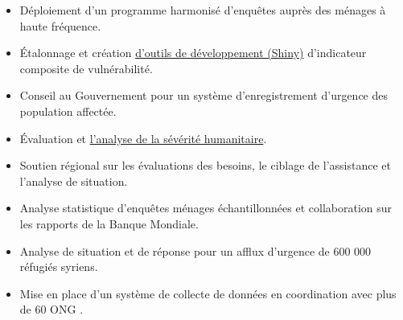 \documentclass[10pt,a4paper,ragged2e,withhyper]{altacv}
\begin{document}
\begin{paracol}{2}
\divider

\begin{itemize}
\item Déploiement d'un programme harmonisé d'enquêtes auprès des ménages à haute fréquence.  
\item Étalonnage et création \href{https://rstudio.unhcr.org/SeverityIndex/}{d'outils de développement (Shiny)} d'indicateur composite de vulnérabilité.
\end{itemize}

\divider

\begin{itemize}
\item Conseil au Gouvernement pour un système d'enregistrement d'urgence des population affectée.  
\item Évaluation et  \href{https://humanitarian-user-group.github.io/post/compositeindicator/}{l'analyse de la sévérité humanitaire}.  
\end{itemize}

\divider

\begin{itemize}
\item Soutien régional sur les évaluations des besoins, le ciblage de l'assistance et l'analyse de situation.  
\item Analyse statistique d'enquêtes ménages échantillonnées et collaboration sur les rapports de la Banque Mondiale.
\end{itemize}

\divider

\begin{itemize}
\item Analyse de situation et de réponse pour un afflux d'urgence de 600 000 réfugiés syriens.
\item Mise en place d'un système de collecte de données en coordination avec plus de 60 ONG .
\end{itemize}


\end{paracol}
\end{document}
